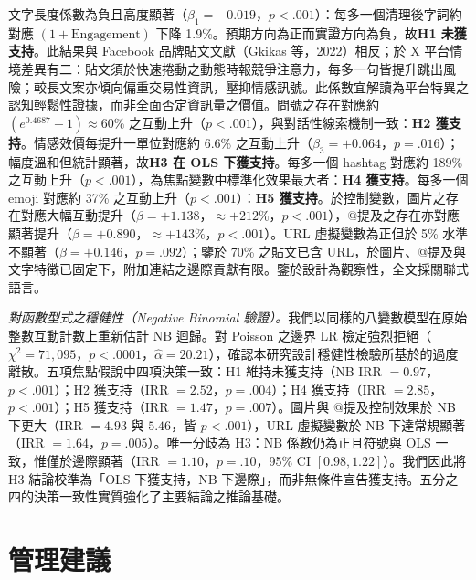\documentclass[12pt,a4paper]{ctexart}
\begin{document}
文字長度係數為負且高度顯著（$\beta_1=-0.019$，$p<.001$）：每多一個清理後字詞約對應 $(1+\text{Engagement})$ 下降 1.9\%。預期方向為正而實證方向為負，故\textbf{H1 未獲支持}。此結果與 Facebook 品牌貼文文獻（Gkikas 等，2022）相反；於 X 平台情境差異有二：貼文須於快速捲動之動態時報競爭注意力，每多一句皆提升跳出風險；較長文案亦傾向偏重交易性資訊，壓抑情感訊號。此係數宜解讀為平台特異之認知輕鬆性證據，而非全面否定資訊量之價值。問號之存在對應約 $(e^{0.4687}-1)\approx 60\%$ 之互動上升（$p<.001$），與對話性線索機制一致：\textbf{H2 獲支持}。情感效價每提升一單位對應約 6.6\% 之互動上升（$\beta_3=+0.064$，$p=.016$）；幅度溫和但統計顯著，故\textbf{H3 在 OLS 下獲支持}。每多一個 hashtag 對應約 189\% 之互動上升（$p<.001$），為焦點變數中標準化效果最大者：\textbf{H4 獲支持}。每多一個 emoji 對應約 37\% 之互動上升（$p<.001$）：\textbf{H5 獲支持}。於控制變數，圖片之存在對應大幅互動提升（$\beta=+1.138$，$\approx +212\%$，$p<.001$），@提及之存在亦對應顯著提升（$\beta=+0.890$，$\approx +143\%$，$p<.001$）。URL 虛擬變數為正但於 5\% 水準不顯著（$\beta=+0.146$，$p=.092$）；鑒於 70\% 之貼文已含 URL，於圖片、@提及與文字特徵已固定下，附加連結之邊際貢獻有限。鑒於設計為觀察性，全文採關聯式語言。

\textit{對函數型式之穩健性（Negative Binomial 驗證）。}我們以同樣的八變數模型在原始整數互動計數上重新估計 NB 迴歸。對 Poisson 之邊界 LR 檢定強烈拒絕（$\chi^2 = 71{,}095$，$p<.0001$，$\hat\alpha=20.21$），確認本研究設計穩健性檢驗所基於的過度離散。五項焦點假說中四項決策一致：H1 維持未獲支持（NB IRR $=0.97$，$p<.001$）；H2 獲支持（IRR $=2.52$，$p=.004$）；H4 獲支持（IRR $=2.85$，$p<.001$）；H5 獲支持（IRR $=1.47$，$p=.007$）。圖片與 @提及控制效果於 NB 下更大（IRR $=4.93$ 與 $5.46$，皆 $p<.001$），URL 虛擬變數於 NB 下達常規顯著（IRR $=1.64$，$p=.005$）。唯一分歧為 H3：NB 係數仍為正且符號與 OLS 一致，惟僅於邊際顯著（IRR $=1.10$，$p=.10$，95\% CI $[0.98, 1.22]$）。我們因此將 H3 結論校準為「OLS 下獲支持，NB 下邊際」，而非無條件宣告獲支持。五分之四的決策一致性實質強化了主要結論之推論基礎。

\section{管理建議}
\end{document}
